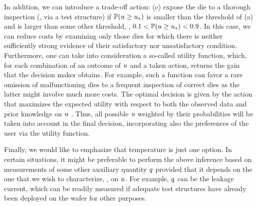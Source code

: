 In addition, we can introduce a trade-off action: (c) expose the die to a thorough inspection (\eg, via a test structure) if $\mathbb{P}(u \geq u_*)$ is smaller than the threshold of (a) and is larger than some other threshold, \eg, $0.1 < \mathbb{P}(u \geq u_*) < 0.9$. In this case, we can reduce costs by examining only those dies for which there is neither sufficiently strong evidence of their satisfactory nor unsatisfactory condition.
Furthermore, one can take into consideration a so-called utility function, which, for each combination of an outcome of $u$ and a taken action, returns the gain that the decision maker obtains.
For example, such a function can favor a rare omission of malfunctioning dies to a frequent inspection of correct dies as the latter might involve much more costs.
The optimal decision is given by the action that maximizes the expected utility with respect to both the observed data and prior knowledge on $u$ \cite{bernardo2007}.
Thus, all possible $u$ weighted by their probabilities will be taken into account in the final decision, incorporating also the preferences of the user via the utility function.

Finally, we would like to emphasize that temperature is just one option.
In certain situations, it might be preferable to perform the above inference based on measurements of some other auxiliary quantity $q$ provided that it depends on the one that we wish to characterize, \ie, on $u$.
For example, $q$ can be the leakage current, which can be readily measured if adequate test structures have already been deployed on the wafer for other purposes.
